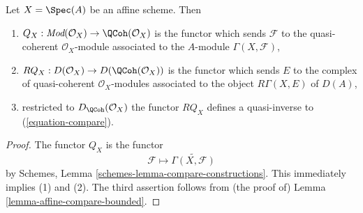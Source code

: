 \begin{lemma}
\label{lemma-affine-coherator}
Let $X = \Spec(A)$ be an affine scheme. Then
\begin{enumerate}
\item $Q_X : \textit{Mod}(\mathcal{O}_X) \to \QCoh(\mathcal{O}_X)$
is the functor
which sends $\mathcal{F}$ to the quasi-coherent $\mathcal{O}_X$-module
associated to the $A$-module $\Gamma(X, \mathcal{F})$,
\item $RQ_X : D(\mathcal{O}_X) \to D(\QCoh(\mathcal{O}_X))$
is the functor which sends $E$ to the complex of quasi-coherent
$\mathcal{O}_X$-modules associated to the object $R\Gamma(X, E)$ of $D(A)$,
\item restricted to $D_\QCoh(\mathcal{O}_X)$ the functor
$RQ_X$ defines a quasi-inverse to (\ref{equation-compare}).
\end{enumerate}
\end{lemma}

\begin{proof}
The functor $Q_X$ is the functor
$$
\mathcal{F} \mapsto \widetilde{\Gamma(X, \mathcal{F})}
$$
by Schemes, Lemma \ref{schemes-lemma-compare-constructions}.
This immediately implies (1) and (2). The third assertion
follows from (the proof of)
Lemma \ref{lemma-affine-compare-bounded}.
\end{proof}
